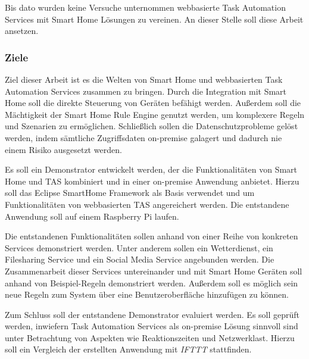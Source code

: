 \documentclass[12pt]{article}
\begin{document}
Bis dato wurden keine Versuche unternommen webbasierte Task Automation Services mit Smart Home Lösungen zu vereinen. An dieser Stelle soll diese Arbeit ansetzen. 


\subsubsection{Ziele}
\label{Ziele}
Ziel dieser Arbeit ist es die Welten von Smart Home und webbasierten Task Automation Services zusammen zu bringen. Durch die Integration mit Smart Home soll die direkte Steuerung von Geräten befähigt werden. Außerdem soll die Mächtigkeit der Smart Home Rule Engine genutzt werden, um komplexere Regeln und Szenarien zu ermöglichen. Schließlich sollen die Datenschutzprobleme gelöst werden, indem sämtliche Zugriffsdaten on-premise galagert und dadurch nie einem Risiko ausgesetzt werden.

Es soll ein Demonstrator entwickelt werden, der die Funktionalitäten von Smart Home und TAS kombiniert und in einer on-premise Anwendung anbietet. Hierzu soll das Eclipse SmartHome Framework als Basis verwendet und um Funktionalitäten von webbasierten TAS angereichert werden. Die entstandene Anwendung soll auf einem Raspberry Pi laufen.

Die entstandenen Funktionalitäten sollen anhand von einer Reihe von konkreten Services demonstriert werden. Unter anderem sollen ein Wetterdienst, ein Filesharing Service und ein Social Media Service angebunden werden. Die Zusammenarbeit dieser Services untereinander und mit Smart Home Geräten soll anhand von Beispiel-Regeln demonstriert werden. Außerdem soll es möglich sein neue Regeln zum System über eine Benutzeroberfläche hinzufügen zu können.

Zum Schluss soll der entstandene Demonstrator evaluiert werden. Es soll geprüft werden, inwiefern Task Automation Services als on-premise Lösung sinnvoll sind unter Betrachtung von Aspekten wie Reaktionszeiten und Netzwerklast. Hierzu soll ein Vergleich der erstellten Anwendung mit \textit{IFTTT} stattfinden.




\end{document}
